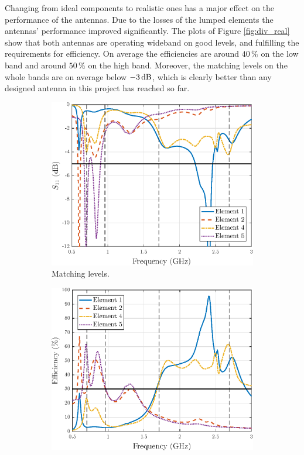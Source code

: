 Changing from ideal components to realistic ones has a major effect on the performance of the antennas. Due to the losses of the lumped elements the antennas' performance improved significantly. The plots of Figure \ref{fig:div_real} show that both antennas are operating wideband on good levels, and fulfilling the requirements for efficiency. On average the efficiencies are around $40\,\%$ on the low band and around $50\,\%$ on the high band. Moreover, the matching levels on the whole bands are on average below $-3\,\mathrm{dB}$, which is clearly better than any designed antenna in this project has reached so far.

\begin{figure}[H]
    \centering
    \begin{subfigure}[b]{0.49\textwidth}
        \includegraphics[width=\textwidth]{img/diversity_final_real_match.eps}
        \caption{Matching levels.}
        \label{fig:div_match_real}
    \end{subfigure}
    \begin{subfigure}[b]{0.49\textwidth}
        \includegraphics[width=\textwidth]{img/diversity_eff_real.eps}

\end{subfigure}
\end{figure}
